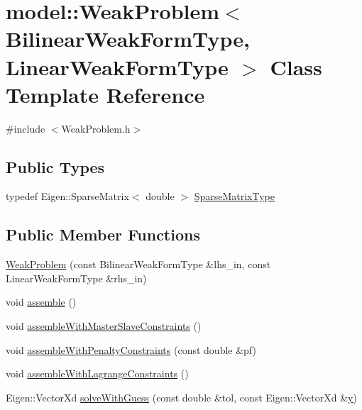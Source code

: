 \hypertarget{classmodel_1_1_weak_problem}{}\section{model\+:\+:Weak\+Problem$<$ Bilinear\+Weak\+Form\+Type, Linear\+Weak\+Form\+Type $>$ Class Template Reference}
\label{classmodel_1_1_weak_problem}


{\ttfamily \#include $<$Weak\+Problem.\+h$>$}

\subsection*{Public Types}
\begin{DoxyCompactItemize}
\item 
typedef Eigen\+::\+Sparse\+Matrix$<$ double $>$ \hyperlink{classmodel_1_1_weak_problem_ac6f9c93aad1dbfc9ed93364bce632dc6}{Sparse\+Matrix\+Type}
\end{DoxyCompactItemize}
\subsection*{Public Member Functions}
\begin{DoxyCompactItemize}
\item 
\hyperlink{classmodel_1_1_weak_problem_a9cb3136e5c4a6e0e16928f71ca6e66c7}{Weak\+Problem} (const Bilinear\+Weak\+Form\+Type \&lhs\+\_\+in, const Linear\+Weak\+Form\+Type \&rhs\+\_\+in)
\item 
void \hyperlink{classmodel_1_1_weak_problem_aec52e63e74721fdd82c59befe3b1e3b7}{assemble} ()
\item 
void \hyperlink{classmodel_1_1_weak_problem_a18b33891c10af11039a0c0587b76a149}{assemble\+With\+Master\+Slave\+Constraints} ()
\item 
void \hyperlink{classmodel_1_1_weak_problem_adde5fea7f839b67397bf5b68812d2054}{assemble\+With\+Penalty\+Constraints} (const double \&pf)
\item 
void \hyperlink{classmodel_1_1_weak_problem_a03b3847a3852dd5d7f86ccc1d0bf5a81}{assemble\+With\+Lagrange\+Constraints} ()
\item 
Eigen\+::\+Vector\+Xd \hyperlink{classmodel_1_1_weak_problem_ab9c8fd6f88e3a1851be449176838a3cc}{solve\+With\+Guess} (const double \&tol, const Eigen\+::\+Vector\+Xd \&\hyperlink{generate_s_t_lcyl_8m_a2fb1c5cf58867b5bbc9a1b145a86f3a0}{y})
\end{DoxyCompactItemize}
